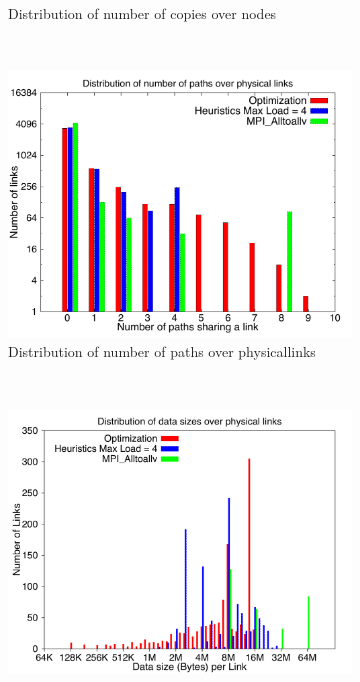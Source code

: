 \begin{figure}[!htbp]
\begin{subfigure}[b]{0.49\textwidth}
                \caption{Distribution of number of copies over nodes}
                \label{fig:27_512_copy}
        \end{subfigure}
        ~ %
        \begin{subfigure}[b]{0.49\textwidth}
                \includegraphics[width=\textwidth]{report_figures/constantr/27_512/loadpath_histo.pdf}
                \caption{Distribution of number of paths over physicallinks}
                \label{fig:27_512_loadpath}
        \end{subfigure}
        ~ %
        \begin{subfigure}[b]{0.49\textwidth}
                \includegraphics[width=\textwidth]{report_figures/constantr/27_512/loaddata_histo.pdf}

\end{subfigure}
\end{figure}
